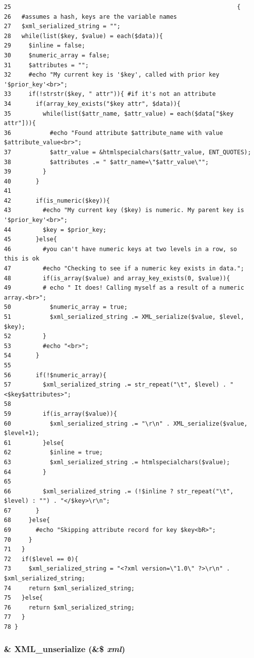 \begin{Code}\begin{verbatim}25                                                                {
26   #assumes a hash, keys are the variable names
27   $xml_serialized_string = "";
28   while(list($key, $value) = each($data)){
29     $inline = false;
30     $numeric_array = false;
31     $attributes = "";
32     #echo "My current key is '$key', called with prior key '$prior_key'<br>";
33     if(!strstr($key, " attr")){ #if it's not an attribute
34       if(array_key_exists("$key attr", $data)){
35         while(list($attr_name, $attr_value) = each($data["$key attr"])){
36           #echo "Found attribute $attribute_name with value $attribute_value<br>";
37           $attr_value = &htmlspecialchars($attr_value, ENT_QUOTES);
38           $attributes .= " $attr_name=\"$attr_value\"";
39         }
40       }
41 
42       if(is_numeric($key)){
43         #echo "My current key ($key) is numeric. My parent key is '$prior_key'<br>";
44         $key = $prior_key;
45       }else{
46         #you can't have numeric keys at two levels in a row, so this is ok
47         #echo "Checking to see if a numeric key exists in data.";
48         if(is_array($value) and array_key_exists(0, $value)){
49         # echo " It does! Calling myself as a result of a numeric array.<br>";
50           $numeric_array = true;
51           $xml_serialized_string .= XML_serialize($value, $level, $key);
52         }
53         #echo "<br>";
54       }
55 
56       if(!$numeric_array){
57         $xml_serialized_string .= str_repeat("\t", $level) . "<$key$attributes>";
58 
59         if(is_array($value)){
60           $xml_serialized_string .= "\r\n" . XML_serialize($value, $level+1);
61         }else{
62           $inline = true;
63           $xml_serialized_string .= htmlspecialchars($value);
64         }
65 
66         $xml_serialized_string .= (!$inline ? str_repeat("\t", $level) : "") . "</$key>\r\n";
67       }
68     }else{
69       #echo "Skipping attribute record for key $key<bR>";
70     }
71   }
72   if($level == 0){
73     $xml_serialized_string = "<?xml version=\"1.0\" ?>\r\n" . $xml_serialized_string;
74     return $xml_serialized_string;
75   }else{
76     return $xml_serialized_string;
77   }
78 }
\end{verbatim}
\end{Code}


\hypertarget{xmlrpc_8inc_ef8f3de498a12b230d049cdee6a25145}{
\subsubsection{\setlength{\rightskip}{0pt plus 5cm}\& XML\_\-unserialize (\&\$ {\em xml})}}
\label{xmlrpc_8inc_ef8f3de498a12b230d049cdee6a25145}




